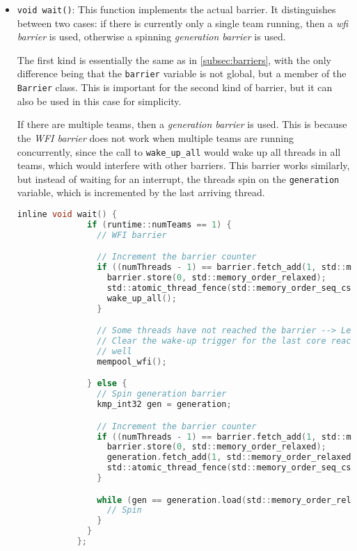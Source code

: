 \begin{itemize}
	\item \texttt{void wait()}: This function implements the actual barrier. It distinguishes
	      between two cases: if there is currently only a single team running, then a
	      \emph{\gls{wfi} barrier} is used, otherwise a spinning \emph{generation barrier} is used.

	      The first kind is essentially the same as in \cref{subsec:barriers}, with the only
	      difference being that the \texttt{barrier} variable is not global, but a member of the
	      \texttt{Barrier} class. This is important for the second kind of barrier, but it can also
	      be used in this case for simplicity.

	      If there are multiple teams, then a \emph{generation barrier} is used. This is because the
	      \emph{WFI barrier} does not work when multiple teams are running concurrently, since the
	      call to \texttt{wake\_up\_all} would wake up all threads in all teams, which would
	      interfere with other barriers. This barrier works similarly, but instead of waiting for an
	      interrupt, the threads spin on the \texttt{generation} variable, which is incremented by
	      the last arriving thread.

	      \begin{lstlisting}[language=C, caption={Barrier::wait}, label={lst:barrier-wait},
          escapechar=@]
            inline void wait() {
              if (runtime::numTeams == 1) {
                // WFI barrier

                // Increment the barrier counter
                if ((numThreads - 1) == barrier.fetch_add(1, std::memory_order_relaxed)) {
                  barrier.store(0, std::memory_order_relaxed);
                  std::atomic_thread_fence(std::memory_order_seq_cst);
                  wake_up_all();
                }

                // Some threads have not reached the barrier --> Let's wait
                // Clear the wake-up trigger for the last core reaching the barrier as
                // well
                mempool_wfi();

              } else {
                // Spin generation barrier
                kmp_int32 gen = generation;

                // Increment the barrier counter
                if ((numThreads - 1) == barrier.fetch_add(1, std::memory_order_relaxed)) {
                  barrier.store(0, std::memory_order_relaxed);
                  generation.fetch_add(1, std::memory_order_relaxed);
                  std::atomic_thread_fence(std::memory_order_seq_cst);
                }

                while (gen == generation.load(std::memory_order_relaxed)) {
                  // Spin
                }
              }
            };
          \end{lstlisting}
\end{itemize}


